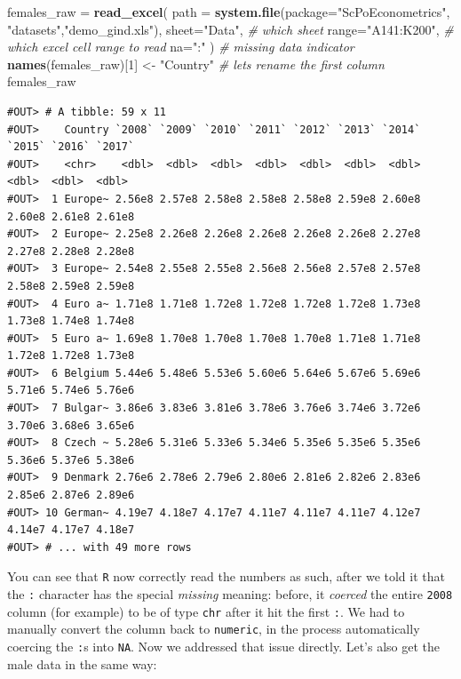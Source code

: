 \documentclass[]{book}
\newenvironment{Shaded}{\begin{snugshade}}{\end{snugshade}}
\newcommand{\KeywordTok}[1]{\textcolor[rgb]{0.13,0.29,0.53}{\textbf{#1}}}
\newcommand{\DataTypeTok}[1]{\textcolor[rgb]{0.13,0.29,0.53}{#1}}
\newcommand{\DecValTok}[1]{\textcolor[rgb]{0.00,0.00,0.81}{#1}}
\newcommand{\StringTok}[1]{\textcolor[rgb]{0.31,0.60,0.02}{#1}}
\newcommand{\CommentTok}[1]{\textcolor[rgb]{0.56,0.35,0.01}{\textit{#1}}}
\newcommand{\NormalTok}[1]{#1}
\begin{document}
\begin{Shaded}
\begin{Highlighting}[]
\NormalTok{females_raw =}\StringTok{ }\KeywordTok{read_excel}\NormalTok{(}
                \DataTypeTok{path =} \KeywordTok{system.file}\NormalTok{(}\DataTypeTok{package=}\StringTok{"ScPoEconometrics"}\NormalTok{,}
                                    \StringTok{"datasets"}\NormalTok{,}\StringTok{"demo_gind.xls"}\NormalTok{), }
                \DataTypeTok{sheet=}\StringTok{"Data"}\NormalTok{, }\CommentTok{# which sheet}
                \DataTypeTok{range=}\StringTok{"A141:K200"}\NormalTok{,  }\CommentTok{# which excel cell range to read}
                \DataTypeTok{na=}\StringTok{":"}\NormalTok{ )   }\CommentTok{# missing data indicator}
\KeywordTok{names}\NormalTok{(females_raw)[}\DecValTok{1}\NormalTok{] <-}\StringTok{ "Country"}   \CommentTok{# lets rename the first column}
\NormalTok{females_raw}
\end{Highlighting}
\end{Shaded}

\begin{verbatim}
#OUT> # A tibble: 59 x 11
#OUT>    Country `2008` `2009` `2010` `2011` `2012` `2013` `2014` `2015` `2016` `2017`
#OUT>    <chr>    <dbl>  <dbl>  <dbl>  <dbl>  <dbl>  <dbl>  <dbl>  <dbl>  <dbl>  <dbl>
#OUT>  1 Europe~ 2.56e8 2.57e8 2.58e8 2.58e8 2.58e8 2.59e8 2.60e8 2.60e8 2.61e8 2.61e8
#OUT>  2 Europe~ 2.25e8 2.26e8 2.26e8 2.26e8 2.26e8 2.26e8 2.27e8 2.27e8 2.28e8 2.28e8
#OUT>  3 Europe~ 2.54e8 2.55e8 2.55e8 2.56e8 2.56e8 2.57e8 2.57e8 2.58e8 2.59e8 2.59e8
#OUT>  4 Euro a~ 1.71e8 1.71e8 1.72e8 1.72e8 1.72e8 1.72e8 1.73e8 1.73e8 1.74e8 1.74e8
#OUT>  5 Euro a~ 1.69e8 1.70e8 1.70e8 1.70e8 1.70e8 1.71e8 1.71e8 1.72e8 1.72e8 1.73e8
#OUT>  6 Belgium 5.44e6 5.48e6 5.53e6 5.60e6 5.64e6 5.67e6 5.69e6 5.71e6 5.74e6 5.76e6
#OUT>  7 Bulgar~ 3.86e6 3.83e6 3.81e6 3.78e6 3.76e6 3.74e6 3.72e6 3.70e6 3.68e6 3.65e6
#OUT>  8 Czech ~ 5.28e6 5.31e6 5.33e6 5.34e6 5.35e6 5.35e6 5.35e6 5.36e6 5.37e6 5.38e6
#OUT>  9 Denmark 2.76e6 2.78e6 2.79e6 2.80e6 2.81e6 2.82e6 2.83e6 2.85e6 2.87e6 2.89e6
#OUT> 10 German~ 4.19e7 4.18e7 4.17e7 4.11e7 4.11e7 4.11e7 4.12e7 4.14e7 4.17e7 4.18e7
#OUT> # ... with 49 more rows
\end{verbatim}

You can see that \texttt{R} now correctly read the numbers as such,
after we told it that the \texttt{:} character has the special
\emph{missing} meaning: before, it \emph{coerced} the entire
\texttt{2008} column (for example) to be of type \texttt{chr} after it
hit the first \texttt{:}. We had to manually convert the column back to
\texttt{numeric}, in the process automatically coercing the \texttt{:}s
into \texttt{NA}. Now we addressed that issue directly. Let's also get
the male data in the same way:
\end{document}

